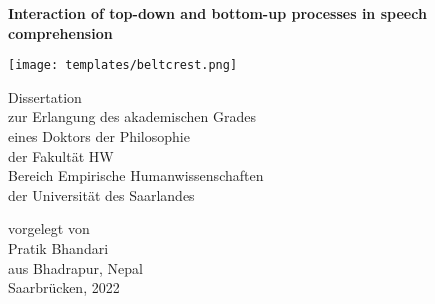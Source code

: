 \thispagestyle{empty}
\begin{center}
\Huge{\textbf{Interaction of top-down and bottom-up processes in speech comprehension}} \\

\vspace*{2cm}

\begin{center}
\texttt{[image: templates/beltcrest.png]}
\end{center}

\vspace*{2cm}

\Large
{Dissertation \\
zur Erlangung des akademischen Grades \\
eines Doktors der Philosophie \\
der Fakultät HW \\
Bereich Empirische Humanwissenschaften \\
der Universität des Saarlandes} \\

\vspace*{0.8cm}

\large{vorgelegt von} \\
\vspace*{0.3cm}
\Large{Pratik Bhandari} \\
\vspace*{0.1cm}
\large{aus Bhadrapur, Nepal \\
\vspace*{0.8cm}
Saarbrücken, 2022}

\end{center}

